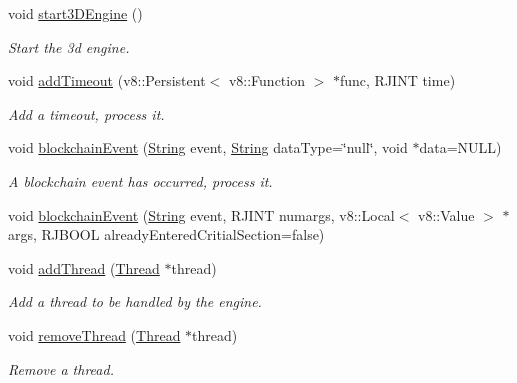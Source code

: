 \begin{DoxyCompactItemize}
void \mbox{\hyperlink{class_rad_j_a_v_1_1_v8_javascript_engine_ae2e4091f33966a1d722690bcd69f2cde}{start3\+D\+Engine}} ()
\begin{DoxyCompactList}\small\item\em Start the 3d engine. \end{DoxyCompactList}\item 
void \mbox{\hyperlink{class_rad_j_a_v_1_1_v8_javascript_engine_ad2c9ab23eb0f84c5776afb6e9e2ed006}{add\+Timeout}} (v8\+::\+Persistent$<$ v8\+::\+Function $>$ $\ast$func, R\+J\+I\+NT time)
\begin{DoxyCompactList}\small\item\em Add a timeout, process it. \end{DoxyCompactList}\item 
void \mbox{\hyperlink{class_rad_j_a_v_1_1_v8_javascript_engine_a13490748bc843ae2d2be22aa889e8e30}{blockchain\+Event}} (\mbox{\hyperlink{class_rad_j_a_v_1_1_string}{String}} event, \mbox{\hyperlink{class_rad_j_a_v_1_1_string}{String}} data\+Type=\char`\"{}null\char`\"{}, void $\ast$data=N\+U\+LL)
\begin{DoxyCompactList}\small\item\em A blockchain event has occurred, process it. \end{DoxyCompactList}\item 
void \mbox{\hyperlink{class_rad_j_a_v_1_1_v8_javascript_engine_adc3d7c751504d623017852ea8bfde1d2}{blockchain\+Event}} (\mbox{\hyperlink{class_rad_j_a_v_1_1_string}{String}} event, R\+J\+I\+NT numargs, v8\+::\+Local$<$ v8\+::\+Value $>$ $\ast$args, R\+J\+B\+O\+OL already\+Entered\+Critial\+Section=false)
\item 
void \mbox{\hyperlink{class_rad_j_a_v_1_1_v8_javascript_engine_ab72b1bfbf3740039b0ae00008a5e4dd3}{add\+Thread}} (\mbox{\hyperlink{class_rad_j_a_v_1_1_thread}{Thread}} $\ast$thread)
\begin{DoxyCompactList}\small\item\em Add a thread to be handled by the engine. \end{DoxyCompactList}\item 
void \mbox{\hyperlink{class_rad_j_a_v_1_1_v8_javascript_engine_a90a52c8c7d655d2e8e5e682d7618c2ab}{remove\+Thread}} (\mbox{\hyperlink{class_rad_j_a_v_1_1_thread}{Thread}} $\ast$thread)
\begin{DoxyCompactList}\small\item\em Remove a thread. \end{DoxyCompactList}\item 

\end{DoxyCompactItemize}
